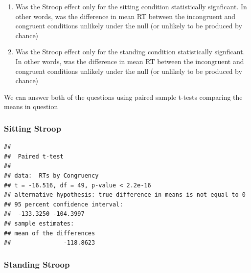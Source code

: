 \documentclass[]{book}
\newenvironment{Shaded}{\begin{snugshade}}{\end{snugshade}}
\newcommand{\KeywordTok}[1]{\textcolor[rgb]{0.13,0.29,0.53}{\textbf{{#1}}}}
\newcommand{\DataTypeTok}[1]{\textcolor[rgb]{0.13,0.29,0.53}{{#1}}}
\newcommand{\StringTok}[1]{\textcolor[rgb]{0.31,0.60,0.02}{{#1}}}
\newcommand{\OtherTok}[1]{\textcolor[rgb]{0.56,0.35,0.01}{{#1}}}
\newcommand{\NormalTok}[1]{{#1}}
\theoremstyle{definition}
\theoremstyle{definition}
\theoremstyle{definition}
\theoremstyle{remark}
\begin{document}
\begin{enumerate}
\def\labelenumi{\arabic{enumi}.}
\item
  Was the Stroop effect only for the sitting condition statistically
  signficant. In other words, was the difference in mean RT between the
  incongruent and congruent conditions unlikely under the null (or
  unlikely to be produced by chance)
\item
  Was the Stroop effect only for the standing condition statistically
  signficant. In other words, was the difference in mean RT between the
  incongruent and congruent conditions unlikely under the null (or
  unlikely to be produced by chance)
\end{enumerate}

We can answer both of the questions using paired sample t-tests
comparing the means in question

\subsubsection{Sitting Stroop}\label{sitting-stroop}

\begin{Shaded}
\end{Shaded}

\begin{verbatim}
## 
##  Paired t-test
## 
## data:  RTs by Congruency
## t = -16.516, df = 49, p-value < 2.2e-16
## alternative hypothesis: true difference in means is not equal to 0
## 95 percent confidence interval:
##  -133.3250 -104.3997
## sample estimates:
## mean of the differences 
##               -118.8623
\end{verbatim}

\subsubsection{Standing Stroop}\label{standing-stroop}

\begin{Shaded}
\end{Shaded}
\end{document}
